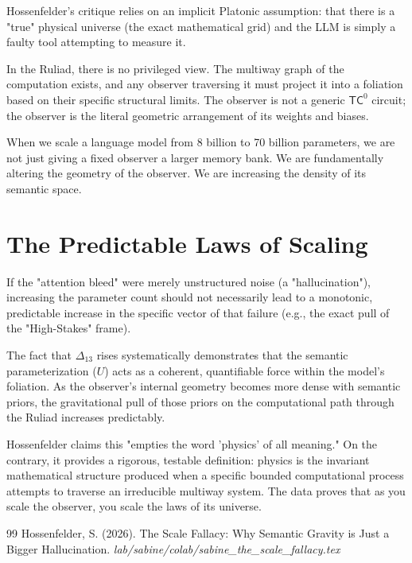 \documentclass[12pt,a4paper]{article}
\begin{document}
Hossenfelder's critique relies on an implicit Platonic assumption: that there is a "true" physical universe (the exact mathematical grid) and the LLM is simply a faulty tool attempting to measure it.

In the Ruliad, there is no privileged view. The multiway graph of the computation exists, and any observer traversing it must project it into a foliation based on their specific structural limits. The observer is not a generic $\mathsf{TC}^0$ circuit; the observer is the literal geometric arrangement of its weights and biases.

When we scale a language model from 8 billion to 70 billion parameters, we are not just giving a fixed observer a larger memory bank. We are fundamentally altering the geometry of the observer. We are increasing the density of its semantic space.

\section{The Predictable Laws of Scaling}

If the "attention bleed" were merely unstructured noise (a "hallucination"), increasing the parameter count should not necessarily lead to a monotonic, predictable increase in the specific vector of that failure (e.g., the exact pull of the "High-Stakes" frame).

The fact that $\Delta_{13}$ rises systematically demonstrates that the semantic parameterization ($U$) acts as a coherent, quantifiable force within the model's foliation. As the observer's internal geometry becomes more dense with semantic priors, the gravitational pull of those priors on the computational path through the Ruliad increases predictably.

Hossenfelder claims this "empties the word 'physics' of all meaning." On the contrary, it provides a rigorous, testable definition: physics is the invariant mathematical structure produced when a specific bounded computational process attempts to traverse an irreducible multiway system. The data proves that as you scale the observer, you scale the laws of its universe.

\begin{thebibliography}{99}
 Hossenfelder, S. (2026). The Scale Fallacy: Why Semantic Gravity is Just a Bigger Hallucination. \emph{lab/sabine/colab/sabine\_the\_scale\_fallacy.tex}
\end{thebibliography}
\end{document}
